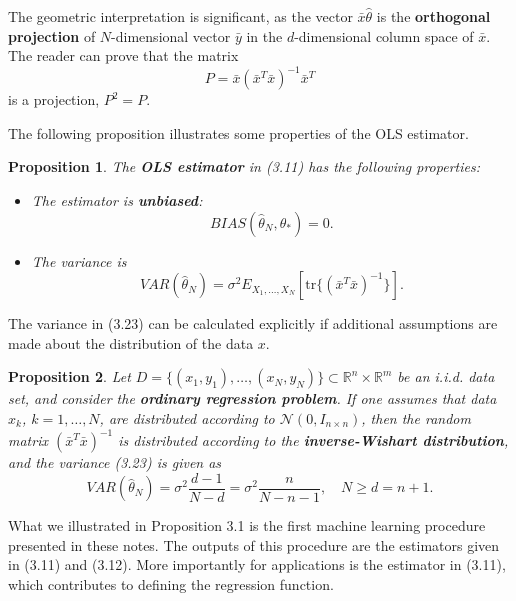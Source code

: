 \documentclass{report}
\newtheorem{proposition}{Proposition}[chapter]
\begin{document}
The geometric interpretation is significant, as the vector $\bar{x}\hat{\theta}$ is the \textbf{orthogonal projection} of $N$-dimensional vector $\bar{y}$ in the $d$-dimensional column space of $\bar{x}$. The reader can prove that the matrix
\begin{equation}
P = \bar{x}(\bar{x}^T\bar{x})^{-1}\bar{x}^T
\end{equation}
is a projection, $P^2 = P$.

The following proposition illustrates some properties of the OLS estimator.

\begin{proposition}
The \textbf{OLS estimator} in (3.11) has the following properties:
\begin{itemize}
\item The estimator is \textbf{unbiased}:
\begin{equation}
BIAS(\hat{\theta}_N, \theta_*) = 0.
\end{equation}
\item The variance is
\begin{equation}
VAR(\hat{\theta}_N) = \sigma^2 E_{X_1,\dots,X_N}[\mathrm{tr}\{(\bar{x}^T\bar{x})^{-1}\}].
\end{equation}
\end{itemize}
\end{proposition}

The variance in (3.23) can be calculated explicitly if additional assumptions are made about the distribution of the data $x$.

\begin{proposition}
Let $D = \{(x_1,y_1),\dots,(x_N,y_N)\} \subset \mathbb{R}^n \times \mathbb{R}^m$ be an i.i.d. data set, and consider the \textbf{ordinary regression problem}. If one assumes that data $x_k$, $k = 1, \dots, N$, are distributed according to $\mathcal{N}(0, I_{n\times n})$, then the random matrix $(\bar{x}^T\bar{x})^{-1}$ is distributed according to the \textbf{inverse-Wishart distribution}, and the variance (3.23) is given as
\begin{equation}
VAR(\hat{\theta}_N) = \sigma^2\frac{d - 1}{N - d} = \sigma^2\frac{n}{N - n - 1}, \quad  N \geq d = n + 1.
\end{equation}
\end{proposition}

What we illustrated in Proposition 3.1 is the first machine learning procedure presented in these notes. The outputs of this procedure are the estimators given in (3.11) and (3.12). More importantly for applications is the estimator in (3.11), which contributes to defining the regression function.
\end{document}
